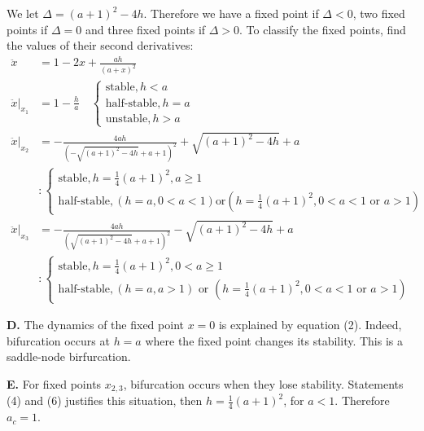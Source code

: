 \documentclass[]{article}
\begin{document}
	We let $\Delta = (a+1)^2-4h$. Therefore we have a fixed point if $\Delta < 0$, two fixed points if $\Delta = 0$ and three fixed points if $\Delta > 0$. To classify the fixed points, find the values of their second derivatives:
	\begin{align}
	\ddot{x} &= 1 - 2x + \frac{ah}{(a+x)^2}\\
	\ddot{x} | _{x_1} &= 1 - \frac{h}{a} \quad
	\begin{cases}
	\text{stable}, h<a\\
	\text{half-stable}, h=a\\
	\text{unstable}, h>a
	\end{cases}
	\\
	\ddot{x} | _{x_2} &= -\frac{4 a h}{\left(-\sqrt{(a+1)^2-4 h}+a+1\right)^2}+\sqrt{(a+1)^2-4 h}+a \\
	&:
	\begin{cases}
	\text{stable}, h=\frac{1}{4}(a+1)^2, a\geq 1\\
	\text{half-stable}, \left(h=a, 0<a<1\right) \text{or} \left(h=\frac{1}{4}(a+1)^2, 0 < a < 1 \text{ or } a > 1\right)
	\end{cases}
	\\
	\ddot{x} | _{x_3} &= -\frac{4 a h}{\left(\sqrt{(a+1)^2-4 h}+a+1\right)^2}-\sqrt{(a+1)^2-4 h}+a\\
	&:
	\begin{cases}
	\text{stable}, h=\frac{1}{4}(a+1)^2, 0<a\geq 1\\
	\text{half-stable}, \left(h=a, a>1\right) \text{ or } \left(h=\frac{1}{4}(a+1)^2, 0<a<1 \text{ or } a>1\right)
	\end{cases}
	\end{align}
	
	\textbf{D.} The dynamics of the fixed point $x=0$ is explained by equation (2). Indeed, bifurcation occurs at $h=a$ where the fixed point changes its stability. This is a saddle-node birfurcation.
	
	\textbf{E.} For fixed points $x_{2,3}$, bifurcation occurs when they lose stability. Statements (4) and (6) justifies this situation, then $h=\frac{1}{4}(a+1)^2$, for $a<1$. Therefore $a_c=1$.
	
\end{document}

